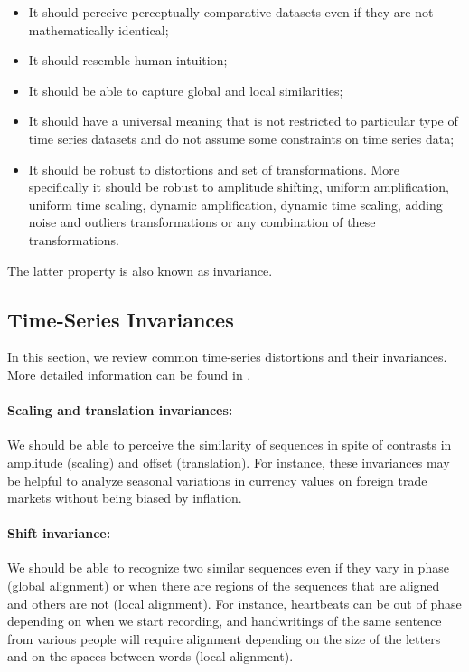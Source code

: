 \begin{itemize}
\item It should perceive perceptually comparative datasets even if  they are not mathematically identical;
\item It should resemble human intuition;
\item It should be able to capture global and local similarities;
\item It should have a universal meaning that is not restricted to particular type of time series datasets and do not assume some constraints on time series data;
\item It should be robust to distortions and set of transformations. More specifically it should be robust to amplitude
shifting, uniform amplification, uniform time scaling, dynamic amplification, dynamic time scaling, adding noise and outliers transformations or any combination of these transformations.
\end{itemize}
The latter property is also known as invariance.

\subsection{Time-Series Invariances}
In this section, we review common time-series distortions and their invariances. More detailed information can be found in \cite{batista2014cid}. 

\paragraph{Scaling and translation invariances:} We should be able to perceive the similarity of sequences in spite of contrasts in amplitude (scaling) and offset (translation). For instance, these invariances may be helpful to analyze seasonal variations in currency values on foreign trade markets without being biased by inflation.


\paragraph{Shift invariance:}  We should be able to recognize two similar sequences even if they vary in phase (global alignment) or when there are regions of the sequences that are aligned and others are not (local alignment). For instance, heartbeats can be out of phase depending on when we start recording, and handwritings of the same sentence from various people will require alignment depending on the size of the letters and on the spaces between words (local alignment).


